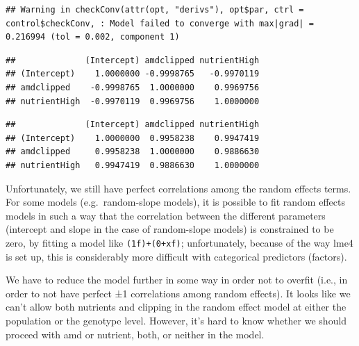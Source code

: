 \documentclass[
  12pt,
]{book}
\newenvironment{Shaded}{\begin{snugshade}}{\end{snugshade}}
\newcommand{\FunctionTok}[1]{\textcolor[rgb]{0.00,0.00,0.00}{#1}}
\newcommand{\NormalTok}[1]{#1}
\newcommand{\SpecialCharTok}[1]{\textcolor[rgb]{0.00,0.00,0.00}{#1}}
\newcommand{\StringTok}[1]{\textcolor[rgb]{0.31,0.60,0.02}{#1}}
\begin{document}
\begin{verbatim}
## Warning in checkConv(attr(opt, "derivs"), opt$par, ctrl = control$checkConv, : Model failed to converge with max|grad| = 0.216994 (tol = 0.002, component 1)
\end{verbatim}

\begin{Shaded}
\end{Shaded}

\begin{verbatim}
##              (Intercept) amdclipped nutrientHigh
## (Intercept)    1.0000000 -0.9998765   -0.9970119
## amdclipped    -0.9998765  1.0000000    0.9969756
## nutrientHigh  -0.9970119  0.9969756    1.0000000
\end{verbatim}

\begin{Shaded}
\end{Shaded}

\begin{verbatim}
##              (Intercept) amdclipped nutrientHigh
## (Intercept)    1.0000000  0.9958238    0.9947419
## amdclipped     0.9958238  1.0000000    0.9886630
## nutrientHigh   0.9947419  0.9886630    1.0000000
\end{verbatim}

Unfortunately, we still have perfect correlations among the random effects terms. For some models (e.g.~random-slope models), it is possible to fit random effects models in such a way that the correlation between the different parameters (intercept and slope in the case of random-slope models) is constrained to be zero, by fitting a model like \texttt{(1\textbar{}f)+(0+x\textbar{}f)}; unfortunately, because of the way lme4 is set up, this is considerably more difficult with categorical predictors (factors).

We have to reduce the model further in some way in order not to overfit (i.e., in order to not have perfect ±1 correlations among random effects). It looks like we can't allow both nutrients and clipping in the random effect model at either the population or the genotype level. However, it's hard to know whether we should proceed with amd or nutrient, both, or neither in the model.
\end{document}
